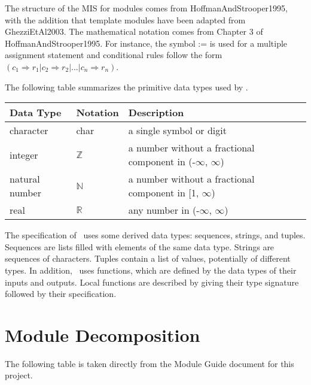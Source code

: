 \documentclass[12pt, titlepage]{article}
\begin{document}
The structure of the MIS for modules comes from HoffmanAndStrooper1995,
with the addition that template modules have been adapted from
GhezziEtAl2003.  The mathematical notation comes from Chapter 3 of
HoffmanAndStrooper1995.  For instance, the symbol := is used for a
multiple assignment statement and conditional rules follow the form $(c_1
\Rightarrow r_1 | c_2 \Rightarrow r_2 | ... | c_n \Rightarrow r_n )$.

The following table summarizes the primitive data types used by \progname. 

\begin{center}
\renewcommand{\arraystretch}{1.2}
\noindent 
\begin{tabular}{l l p{7.5cm}} 
\toprule 
\textbf{Data Type} & \textbf{Notation} & \textbf{Description}\\ 
\midrule
character & char & a single symbol or digit\\
integer & $\mathbb{Z}$ & a number without a fractional component in (-$\infty$, $\infty$) \\
natural number & $\mathbb{N}$ & a number without a fractional component in [1, $\infty$) \\
real & $\mathbb{R}$ & any number in (-$\infty$, $\infty$)\\
\bottomrule
\end{tabular} 
\end{center}

\noindent
The specification of \progname \ uses some derived data types: sequences, strings, and
tuples. Sequences are lists filled with elements of the same data type. Strings
are sequences of characters. Tuples contain a list of values, potentially of
different types. In addition, \progname \ uses functions, which
are defined by the data types of their inputs and outputs. Local functions are
described by giving their type signature followed by their specification.

\newpage

\section{Module Decomposition}

The following table is taken directly from the Module Guide document for this project.
\end{document}
